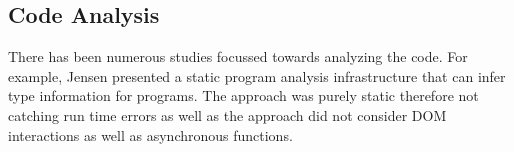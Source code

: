 	\subsection{\javascript Code Analysis}
	\label{Sec:Related2}
	There has been numerous studies focussed towards analyzing the \javascript code. For example, Jensen \etal \cite{jensen2009type} presented a static program analysis infrastructure that can infer type information for \javascript programs. The approach was purely static therefore not catching run time errors as well as the approach did not consider DOM interactions as well as asynchronous functions.
